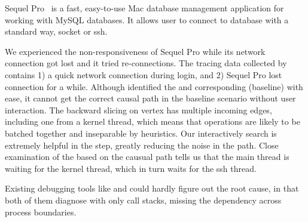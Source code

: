 Sequel Pro~\cite{SequelPro} is a fast, easy-to-use Mac database management
application for working with MySQL databases. It allows user to connect to
database with a standard way, socket or ssh.

We experienced the non-responsiveness of Sequel Pro while its network connection
got lost and it tried re-connections. The tracing data collected by \xxx
contains 1) a quick network connection during login, and 2) Sequel Pro lost
connection for a while. Although \xxx identified the \spinningnode and
corresponding (baseline) \similarnode with ease, it cannot get the correct
causal path in the baseline scenario without user interaction. The backward
slicing on vertex has multiple incoming edges, including one from a
kernel thread, which means that operations are likely to be batched together and inseparable by heuristics. Our interactively search is
extremely helpful in the step, greatly reducing the noise in the path. Close
examination of the \spinningnode based on the causual path tells us that the main
thread is waiting for the kernel thread, which in turn waits for the ssh thread.


Existing debugging tools like  and  could hardly figure
out the root cause, in that both of them diagnose with only call stacks, missing
the dependency across process boundaries.
